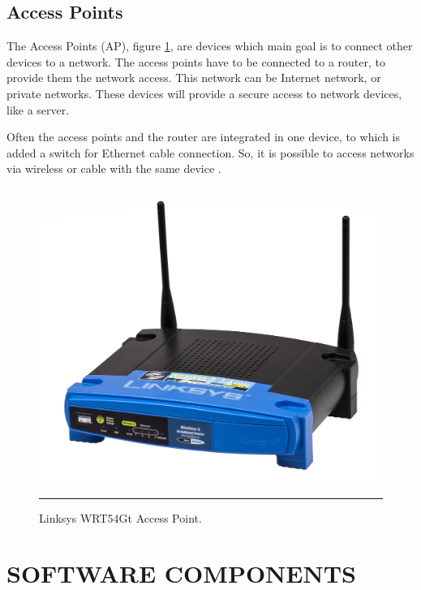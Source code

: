 \documentclass[12pt, a4paper,twoside]{tesi_upf}
\begin{document}
        \subsection{Access Points}
        The Access Points (AP), figure \ref{fig:ap}, are devices which main goal is to connect other devices to a network. The access points have to be connected to a router, to provide them the network access. This network can be Internet network, or private networks. These devices will provide a secure access to network devices, like a server. 

        Often the access points and the router are integrated in one device, to which is added a switch for Ethernet cable connection. So, it is possible to access networks via wireless or cable with the same device \cite{ap}.
        
        
         \begin{figure}[htbp]
          \centering
              \includegraphics[scale=0.1]{./figures/Ap.png}
              \rule{32em}{0.5pt}
          \caption[Access Point]{Linksys WRT54Gt Access Point.}
          \label{fig:ap}
        \end{figure}
    
    \section{SOFTWARE COMPONENTS}
    
\end{document}
